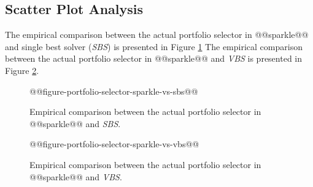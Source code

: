 \documentclass[british]{article}
\begin{document}
\subsection{Scatter Plot Analysis}

The empirical comparison between the actual portfolio selector in @@sparkle@@ and single best solver (\emph{SBS}) is presented in Figure \ref{fig:sparkle_vs_sbs}
The empirical comparison between the actual portfolio selector in @@sparkle@@ and \emph{VBS} is presented in Figure \ref{fig:sparkle_vs_vbs}.


%

\begin{figure}[htbp]
\noindent \begin{centering}
@@figure-portfolio-selector-sparkle-vs-sbs@@
\par\end{centering}

\caption{Empirical comparison between the actual portfolio selector in @@sparkle@@ and \emph{SBS}.}\label{fig:sparkle_vs_sbs}
\end{figure}

\begin{figure}[htbp]
\noindent \begin{centering}
@@figure-portfolio-selector-sparkle-vs-vbs@@
\par\end{centering}

\caption{Empirical comparison between the actual portfolio selector in @@sparkle@@ and \emph{VBS}.}\label{fig:sparkle_vs_vbs}
\end{figure}





\end{document}
